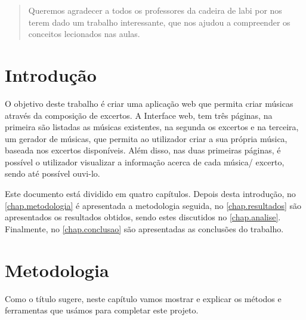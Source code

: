 \documentclass{report}
\begin{document}
\renewcommand{\abstractname}{Agradecimentos}
\begin{abstract}
Queremos agradecer a todos os professores da cadeira de \ac{labi} por nos terem
dado um trabalho interessante, que nos ajudou a compreender os conceitos
lecionados nas aulas.
\end{abstract}


\tableofcontents


\clearpage
{}


\chapter{Introdução}
\label{chap.introducao}

O objetivo deste trabalho é criar uma aplicação web que permita criar músicas através da 
composição de excertos. A Interface web, tem três páginas, na primeira são 
listadas as músicas existentes, na segunda os excertos e na terceira, um gerador de 
músicas, que permita ao utilizador criar a sua própria música, baseada nos excertos 
disponíveis. Além disso, nas duas primeiras páginas, é possível o utilizador visualizar a
informação acerca de cada música/ excerto, sendo até possível ouvi-lo.

Este documento está dividido em quatro capítulos.
Depois desta introdução,
no \autoref{chap.metodologia} é apresentada a metodologia seguida,
no \autoref{chap.resultados} são apresentados os resultados obtidos,
sendo estes discutidos no \autoref{chap.analise}.
Finalmente, no \autoref{chap.conclusao} são apresentadas
as conclusões do trabalho.


\chapter{Metodologia}
\label{chap.metodologia}
Como o título sugere, neste capítulo vamos mostrar e explicar os métodos e ferramentas 
que usámos para completar este projeto. 

\end{document}
